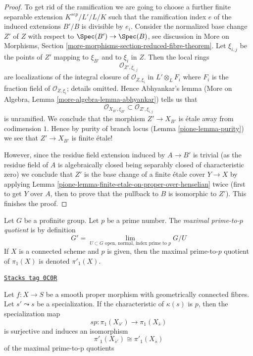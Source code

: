 \begin{proof}
\medskip\noindent
To get rid of the ramification we are going to choose a further finite
separable extension $K^{sep}/L'/L/K$ such that the ramification
index $e$ of the induced extensions $B'/B$ is divisible by $e_i$.
Consider the normalized base change $Z'$ of $Z$ with respect to
$\Spec(B') \to \Spec(B)$, see discussion in
More on Morphisms, Section \ref{more-morphisms-section-reduced-fibre-theorem}.
Let $\xi_{i, j}$ be the points of $Z'$ mapping to $\xi_{B'}$
and to $\xi_i$ in $Z$. Then the local rings
$$
\mathcal{O}_{Z', \xi_{i, j}}
$$
are localizations of the integral closure of $\mathcal{O}_{Z, \xi_i}$
in $L' \otimes_L F_i$ where $F_i$ is the fraction field of
$\mathcal{O}_{Z, \xi_i}$; details omitted. Hence Abhyankar's lemma
(More on Algebra, Lemma \ref{more-algebra-lemma-abhyankar})
tells us that
$$
\mathcal{O}_{X_{B'}, \xi_{B'}} \subset \mathcal{O}_{Z', \xi_{i, j}}
$$
is unramified. We conclude that the morphism $Z' \to X_{B'}$
is \'etale away from codimension $1$. Hence by purity of
branch locus (Lemma \ref{pione-lemma-purity})
we see that $Z' \to X_{B'}$ is finite \'etale!

\medskip\noindent
However, since the residue field extension induced by $A \to B'$
is trivial (as the residue field of $A$ is algebraically closed
being separably closed of characteristic zero)
we conclude that $Z'$ is the base change of a finite \'etale
cover $Y \to X$ by applying
Lemma \ref{pione-lemma-finite-etale-on-proper-over-henselian}
twice (first to get $Y$ over $A$, then to prove that
the pullback to $B$ is isomorphic to $Z'$).
This finishes the proof.
\end{proof}

Let $G$ be a profinite group. Let $p$ be a prime number.
The {\it maximal prime-to-$p$ quotient} is by definition
$$
G' = \lim_{U \subset G\text{ open, normal, index prime to }p} G/U
$$
If $X$ is a connected scheme and $p$ is given, then the maximal
prime-to-$p$ quotient of $\pi_1(X)$ is denoted $\pi'_1(X)$.

\begin{theorem}
\label{pione-theorem-specialization-map-isomorphism-prime-to-p}
\href{https://stacks.math.columbia.edu/tag/0C0R}{\texttt{Stacks tag 0C0R}}

Let $f : X \to S$ be a smooth proper morphism with geometrically
connected fibres. Let $s' \leadsto s$ be a specialization.
If the characteristic of $\kappa(s)$ is $p$, then the specialization
map
$$
sp : \pi_1(X_{\overline{s}'}) \to \pi_1(X_{\overline{s}})
$$
is surjective and induces an isomorphism
$$
\pi'_1(X_{\overline{s}'}) \cong \pi'_1(X_{\overline{s}})
$$
of the maximal prime-to-p quotients
\end{theorem}

